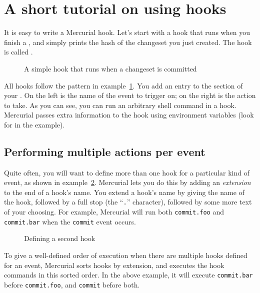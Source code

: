 \section{A short tutorial on using hooks}
\label{sec:hook:simple}

It is easy to write a Mercurial hook.  Let's start with a hook that
runs when you finish a , and simply prints the hash of
the changeset you just created.  The hook is called .

\begin{figure}[ht]
  \caption{A simple hook that runs when a changeset is committed}
  \label{ex:hook:init}
\end{figure}

All hooks follow the pattern in example~\ref{ex:hook:init}.  You add
an entry to the  section of your \hgrc.  On the left
is the name of the event to trigger on; on the right is the action to
take.  As you can see, you can run an arbitrary shell command in a
hook.  Mercurial passes extra information to the hook using
environment variables (look for  in the example).

\subsection{Performing multiple actions per event}

Quite often, you will want to define more than one hook for a
particular kind of event, as shown in example~\ref{ex:hook:ext}.
Mercurial lets you do this by adding an \emph{extension} to the end of
a hook's name.  You extend a hook's name by giving the name of the
hook, followed by a full stop (the ``\texttt{.}'' character), followed
by some more text of your choosing.  For example, Mercurial will run
both \texttt{commit.foo} and \texttt{commit.bar} when the
\texttt{commit} event occurs.

\begin{figure}[ht]
  \caption{Defining a second  hook}
  \label{ex:hook:ext}
\end{figure}

To give a well-defined order of execution when there are multiple
hooks defined for an event, Mercurial sorts hooks by extension, and
executes the hook commands in this sorted order.  In the above
example, it will execute \texttt{commit.bar} before
\texttt{commit.foo}, and \texttt{commit} before both.


